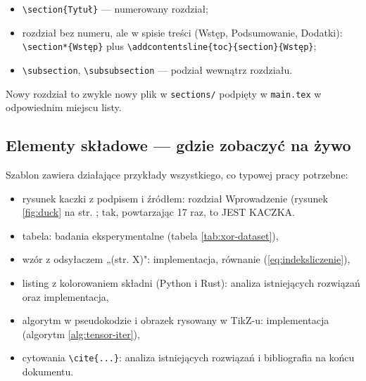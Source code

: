 \begin{itemize}
	\item \verb|\section{Tytuł}| — numerowany rozdział;
	\item rozdział bez numeru, ale w spisie treści (Wstęp, Podsumowanie,
	      Dodatki):
	      \verb|\section*{Wstęp}| plus \verb|\addcontentsline{toc}{section}{Wstęp}|;
	\item \verb|\subsection|, \verb|\subsubsection| — podział wewnątrz rozdziału.
\end{itemize}

Nowy rozdział to zwykle nowy plik w \verb|sections/| podpięty
\verb|| w \verb|main.tex| w odpowiednim miejscu listy.

\subsection*{Elementy składowe — gdzie zobaczyć na żywo}

Szablon zawiera działające przykłady wszystkiego, co typowej pracy
potrzebne:
\begin{itemize}
	\item rysunek kaczki z podpisem i źródłem: rozdział Wprowadzenie
	      (rysunek \ref{fig:duck} na str. \pageref{fig:duck};
	      tak, powtarzając 17 raz, to JEST KACZKA.
	\item tabela: badania eksperymentalne (tabela \ref{tab:xor-dataset}),
	\item wzór z odsyłaczem „(str. X)": implementacja, równanie
	      (\ref{eq:indeksliczenie}),
	\item listing z kolorowaniem składni (Python i Rust): analiza
	      istniejących rozwiązań oraz implementacja,
	\item algorytm w pseudokodzie i obrazek rysowany w TikZ-u: implementacja
	      (algorytm \ref{alg:tensor-iter}),
	\item cytowania \verb|\cite{...}|: analiza istniejących rozwiązań
	      i bibliografia na końcu dokumentu.
\end{itemize}

